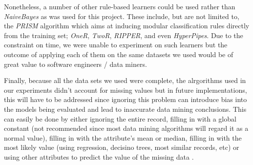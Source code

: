 \documentclass{sig-alternate}
\begin{document}
Nonetheless, a number of other rule-based learners could be used rather than {\em NaiveBayes} as was used for this project. These include, but are not limited to, the {\em PRISM} algorithm which aims at inducing modular classification rules directly from the training set; {\em OneR}, {\em TwoR}, {\em RIPPER}, and even {\em HyperPipes}. Due to the constraint on time, we were unable to experiment on such learners but the outcome of applying each of them on the same datasets we used would be of great value to software engineers / data miners. 

Finally, because all the data sets we used were complete, the alrgorithms used in our experiments didn't account for missing values but in future implementations, this will have to be addressed since ignoring this problem can introduce bias into the models being evaluated and lead to inaccurate data mining conclusions. This can easily be done by either ignoring the entire record, filling in with a global constant (not recommended since most data mining algorithms will regard it as a normal value), filling in with the attribute's mean or median, filling in with the most likely value (using regression, decisino trees, most similar records, etc) or using other attributes to predict the value of the missing data \cite{missingdata}.

%

%
%
\end{document}
